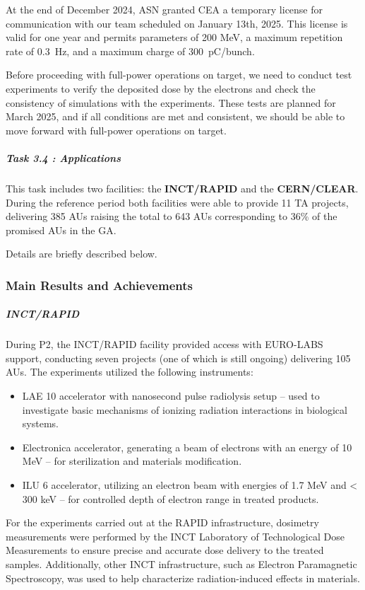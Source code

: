 {At the end of December 2024, ASN granted CEA a temporary license for communication with our team scheduled on January 13th, 2025. This license is valid for one year and permits parameters of 200 MeV, a maximum repetition rate of \SI{0.3}{Hz}, and a maximum charge of \SI{300}{\pico C/bunch}.

Before proceeding with full-power operations on target, we need to conduct test experiments to verify the deposited dose by the electrons and check the consistency of simulations with the experiments. These tests are planned for March 2025, and if all conditions are met and consistent, we should be able to move forward with full-power operations on target.


\subparagraph{Task 3.4 : Applications} \mbox{}


This task includes two facilities: the {\bf INCT/RAPID} and the {\bf CERN/CLEAR}. During the reference period both facilities were able to provide 11 TA projects, delivering 385 AUs raising the total to 643 AUs corresponding to 36\% of the promised AUs in the GA. 

Details are briefly described below. 

\subsubsection*{Main Results and Achievements}


\subparagraph*{INCT/RAPID} 
During P2, the INCT/RAPID facility provided access with EURO-LABS support, conducting seven projects (one of which is still ongoing) delivering 105 AUs. The experiments utilized the following instruments:
\begin{itemize}
\item LAE 10 accelerator with nanosecond pulse radiolysis setup – used to investigate basic mechanisms of ionizing radiation interactions in biological systems.
\item Electronica accelerator, generating a beam of electrons with an energy of 10 MeV – for sterilization and materials modification.
\item ILU 6 accelerator, utilizing an electron beam with energies of 1.7 MeV and < 300 keV – for controlled depth of electron range in treated products.
\end{itemize}
For the experiments carried out at the RAPID infrastructure, dosimetry measurements were performed by the INCT Laboratory of Technological Dose Measurements to ensure precise and accurate dose delivery to the treated samples. Additionally, other INCT infrastructure, such as Electron Paramagnetic Spectroscopy, was used to help characterize radiation-induced effects in materials.

}
